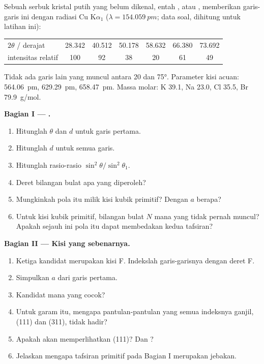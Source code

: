 \begin{problem}
\label{pb:b3:x-ray-diffraction:1}
Sebuah serbuk kristal putih yang belum dikenal, entah , 
atau , memberikan garis-garis ini dengan radiasi Cu K$\alpha_1$
($\lambda = \qty{154.059}{pm}$; data soal, dihitung untuk latihan ini):
\begin{center}\small
\begin{tabular}{lcccccc}
\hline
$2\theta$ / derajat & 28.342 & 40.512 & 50.178 & 58.632 & 66.380 & 73.692 \\
intensitas relatif & 100 & 92 & 38 & 20 & 61 & 49 \\ \hline
\end{tabular}
\end{center}
Tidak ada garis lain yang muncul antara 20 dan \ang{75}. Parameter kisi acuan:
 \qty{564.06}{pm},  \qty{629.29}{pm},  \qty{658.47}{pm}.
Massa molar: K 39.1, Na 23.0, Cl 35.5, Br \qty{79.9}{g/mol}.

\medskip\noindent\textbf{Bagian I --- .}
\begin{enumerate}[beginpenalty=10000]
  \item Hitunglah $\theta$ dan $d$ untuk garis pertama.
  \item Hitunglah $d$ untuk semua garis.
  \item Hitunglah rasio-rasio $\sin^2\theta/\sin^2\theta_1$.
  \item Deret bilangan bulat apa yang diperoleh?
  \item Mungkinkah pola itu milik kisi kubik primitif? Dengan $a$ berapa?
  \item Untuk kisi kubik primitif, bilangan bulat $N$ mana yang tidak pernah
        muncul? Apakah sejauh ini pola itu dapat membedakan kedua tafsiran?
\end{enumerate}

\medskip\noindent\textbf{Bagian II --- Kisi yang sebenarnya.}
\begin{enumerate}[resume, beginpenalty=10000]
  \item Ketiga kandidat merupakan kisi F. Indekslah garis-garisnya dengan
        deret F.
  \item Simpulkan $a$ dari garis pertama.
  \item Kandidat mana yang cocok?
  \item Untuk garam itu, mengapa pantulan-pantulan yang semua indeksnya ganjil,
        (111) dan (311), tidak hadir?
  \item Apakah  akan memperlihatkan (111)? Dan ?
  \item Jelaskan mengapa tafsiran primitif pada Bagian I merupakan jebakan.
\end{enumerate}


\end{problem}
